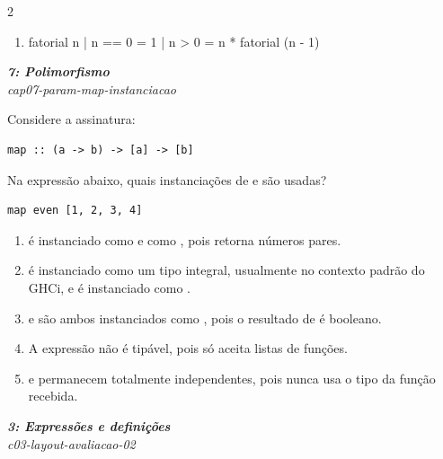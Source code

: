 \documentclass[a4paper,10pt,brazil]{article}
\begin{document}
\begin{multicols}{2}
\begin{enumerate}
  \item \begin{haskellcode}
fatorial n
  | n == 0 = 1
  | n > 0  = n * fatorial (n - 1)
\end{haskellcode}


\end{enumerate}

\begin{flushright}
  \footnotesize
  \textit{\textbf{7: Polimorfismo}}\\
  \textit{cap07-param-map-instanciacao}\\

\end{flushright}
Considere a assinatura:

\begin{verbatim}
map :: (a -> b) -> [a] -> [b]
\end{verbatim}

Na expressão abaixo, quais instanciações de  e  são usadas?

\begin{verbatim}
map even [1, 2, 3, 4]
\end{verbatim}

\begin{enumerate}
  \item {} é instanciado como  e  como , pois  retorna números pares.
  \item {} é instanciado como um tipo integral, usualmente  no contexto padrão do GHCi, e  é instanciado como .
  \item {} e  são ambos instanciados como , pois o resultado de  é booleano.
  \item A expressão não é tipável, pois  só aceita listas de funções.
  \item {} e  permanecem totalmente independentes, pois  nunca usa o tipo da função recebida.

\end{enumerate}

\begin{flushright}
  \footnotesize
  \textit{\textbf{3: Expressões e definições}}\\
  \textit{c03-layout-avaliacao-02}\\


\end{flushright}
\end{multicols}
\end{document}
